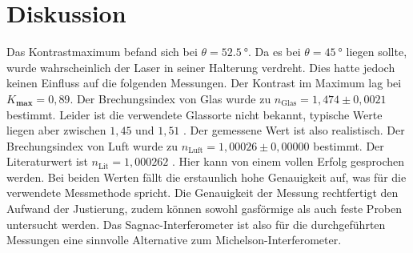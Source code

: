 \section{Diskussion}
Das Kontrastmaximum befand sich bei $\theta = \SI{52.5}{°}$. Da es bei $\theta = \SI{45}{°}$ liegen sollte, wurde wahrscheinlich der Laser in seiner Halterung verdreht. Dies hatte jedoch keinen Einfluss auf die folgenden Messungen. Der Kontrast im Maximum lag bei $K_\textbf{max} = 0,89$.
Der Brechungsindex von Glas wurde zu 
$n_\text{Glas}={1,474 \pm 0,0021}$
bestimmt.
Leider ist die verwendete Glassorte nicht bekannt,
typische Werte liegen aber zwischen ${1,45}$ und
 ${1,51}$ \cite{filmetrics}. Der gemessene Wert ist also realistisch.
Der Brechungsindex von Luft wurde zu $n_\text{Luft}={1,00026 \pm 0,00000}$ bestimmt. Der Literaturwert ist $n_\text{Lit}={1,000262}$ \cite{spektrum}. Hier kann von
einem vollen Erfolg gesprochen werden. Bei beiden Werten fällt die erstaunlich hohe Genauigkeit auf, was für die verwendete Messmethode spricht. Die Genauigkeit der Messung rechtfertigt den Aufwand der Justierung, zudem können sowohl gasförmige als auch feste Proben untersucht werden. Das Sagnac-Interferometer ist also für die durchgeführten Messungen eine sinnvolle Alternative zum Michelson-Interferometer.
\label{sec:Diskussion}
